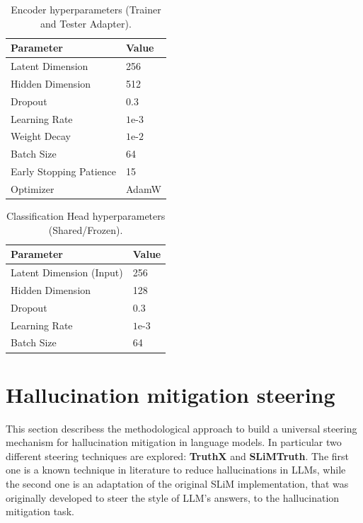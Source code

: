 \begin{table}[H]
\centering
\begin{tabularx}{\textwidth}{Xl}
    \toprule
    \textbf{Parameter} & \textbf{Value} \\
    \midrule
    Latent Dimension & 256 \\
    Hidden Dimension & 512 \\
    Dropout & 0.3 \\
    Learning Rate & $1\text{e-}3$ \\
    Weight Decay & $1\text{e-}2$ \\
    Batch Size & 64 \\
    Early Stopping Patience & 15 \\
    Optimizer & AdamW \\
    \bottomrule
\end{tabularx}
\caption{Encoder hyperparameters (Trainer and Tester Adapter).}
\label{tab:hyperparams-OfA-encoder-clean}
\end{table}

\begin{table}[H]
\centering
\begin{tabularx}{\textwidth}{Xl}
    \toprule
    \textbf{Parameter} & \textbf{Value} \\
    \midrule
    Latent Dimension (Input) & 256 \\
    Hidden Dimension & 128 \\
    Dropout & 0.3 \\
    Learning Rate & $1\text{e-}3$ \\
    Batch Size & 64 \\
    \bottomrule
\end{tabularx}
\caption{Classification Head hyperparameters (Shared/Frozen).}
\label{tab:hyperparams-OfA-head-clean}
\end{table}

\section{Hallucination mitigation steering}
This section describess the methodological approach to build a universal steering mechanism for hallucination mitigation in language models. In particular two different steering techniques are explored: \textbf{TruthX} \cite{TruthX} and \textbf{SLiMTruth}. The first one is a known technique in literature to reduce hallucinations in LLMs, while the second one is an adaptation of the original SLiM \cite{SLiM} implementation, that was originally developed to steer the style of LLM's answers, to the hallucination mitigation task.

